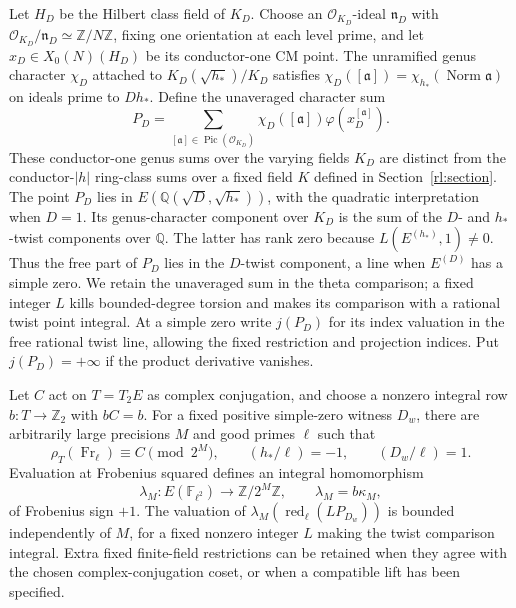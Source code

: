 Let $H_D$ be the Hilbert class field of $K_D$.  Choose an
$\mathcal O_{K_D}$-ideal $\mathfrak n_D$ with
$\mathcal O_{K_D}/\mathfrak n_D\simeq\mathbb Z/N\mathbb Z$,
fixing one orientation at each level prime, and let
$x_D\in X_0(N)(H_D)$ be its conductor-one CM point.  The unramified
genus character $\chi_D$ attached to
$K_D(\sqrt{h_*})/K_D$ satisfies
$\chi_D([\mathfrak a])=\chi_{h_*}(\operatorname{Norm}\mathfrak a)$
on ideals prime to $Dh_*$.  Define the unaveraged character sum
\[
 P_D=\sum_{[\mathfrak a]\in\operatorname{Pic}(\mathcal O_{K_D})}
       \chi_D([\mathfrak a])\varphi(x_D^{[\mathfrak a]}).
\]
These conductor-one genus sums over the varying fields $K_D$ are
distinct from the conductor-$|h|$ ring-class sums over a fixed field
$K$ defined in Section~\ref{rl:section}.
The point $P_D$ lies in $E(\mathbb Q(\sqrt D,\sqrt{h_*}))$, with the quadratic
interpretation when $D=1$.  Its genus-character component over $K_D$
is the sum of the $D$- and $h_*$-twist components over $\mathbb Q$.
The latter has rank zero because $L(E^{(h_*)},1)\ne0$.
Thus the free part of $P_D$ lies in the $D$-twist component, a line
when $E^{(D)}$ has a simple zero.  We retain the unaveraged sum in the
theta comparison; a fixed integer $L$ kills bounded-degree torsion
and makes its comparison with a rational twist point integral.
At a simple zero write $j(P_D)$ for its index valuation in the free
rational twist line, allowing the fixed restriction and projection
indices.  Put $j(P_D)=+\infty$ if the product derivative vanishes.

\begin{lemma}\label{co:kummer}
Let $C$ act on $T=T_2E$ as complex conjugation, and choose a nonzero
integral row $b:T\longrightarrow\mathbb Z_2$ with $bC=b$.
For a fixed positive simple-zero witness $D_w$, there are arbitrarily
large precisions $M$ and good primes $\ell$ such that
\begin{equation}\label{co:ell-conditions}
 \rho_T(\operatorname{Fr}_\ell)\equiv C\pmod {2^M},\qquad
 (h_*/\ell)=-1,\qquad(D_w/\ell)=1.
\end{equation}
Evaluation at Frobenius squared defines an integral homomorphism
\[
 \lambda_M:E(\mathbb F_{\ell^2})\longrightarrow\mathbb Z/2^M\mathbb Z,
 \qquad \lambda_M=b\kappa_M,
\]
of Frobenius sign $+1$.  The valuation of
$\lambda_M(\operatorname{red}_\ell(LP_{D_w}))$ is bounded independently
of $M$, for a fixed nonzero integer $L$ making the twist comparison
integral.  Extra fixed finite-field restrictions can be retained when they agree
with the chosen complex-conjugation coset, or when a compatible lift
has been specified.
\end{lemma}

